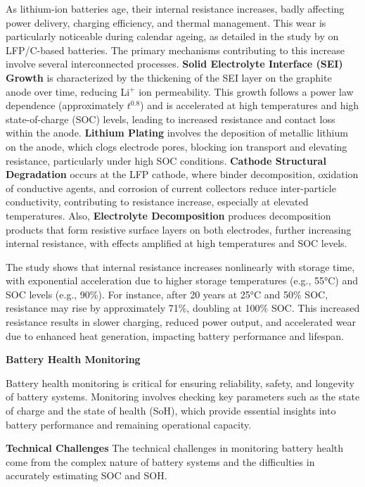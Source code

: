 As lithium-ion batteries age, their internal resistance increases, badly affecting power delivery, charging efficiency, and thermal management. This wear is particularly noticeable during calendar ageing, as detailed in the study by \cite{stroe_degradation_2018} on LFP/C-based batteries. The primary mechanisms contributing to this increase involve several interconnected processes. \textbf{Solid Electrolyte Interface (SEI) Growth} is characterized by the thickening of the SEI layer on the graphite anode over time, reducing Li$^+$ ion permeability. This growth follows a power law dependence (approximately $t^{0.8}$) and is accelerated at high temperatures and high state-of-charge (SOC) levels, leading to increased resistance and contact loss within the anode. \textbf{Lithium Plating} involves the deposition of metallic lithium on the anode, which clogs electrode pores, blocking ion transport and elevating resistance, particularly under high SOC conditions. \textbf{Cathode Structural Degradation} occurs at the LFP cathode, where binder decomposition, oxidation of conductive agents, and corrosion of current collectors reduce inter-particle conductivity, contributing to resistance increase, especially at elevated temperatures. Also, \textbf{Electrolyte Decomposition} produces decomposition products that form resistive surface layers on both electrodes, further increasing internal resistance, with effects amplified at high temperatures and SOC levels.

The study shows that internal resistance increases nonlinearly with storage time, with exponential acceleration due to higher storage temperatures (e.g., 55°C) and SOC levels (e.g., 90\%). For instance, after 20 years at 25°C and 50\% SOC, resistance may rise by approximately 71\%, doubling at 100\% SOC. This increased resistance results in slower charging, reduced power output, and accelerated wear due to enhanced heat generation, impacting battery performance and lifespan.

\textbf{Battery Health Monitoring}

Battery health monitoring is critical for ensuring reliability, safety, and longevity of battery systems. Monitoring involves checking key parameters such as the state of charge and the state of health (SoH), which provide essential insights into battery performance and remaining operational capacity.

\textbf{Technical Challenges}
The technical challenges in monitoring battery health come from the complex nature of battery systems and the difficulties in accurately estimating SOC and SOH.

